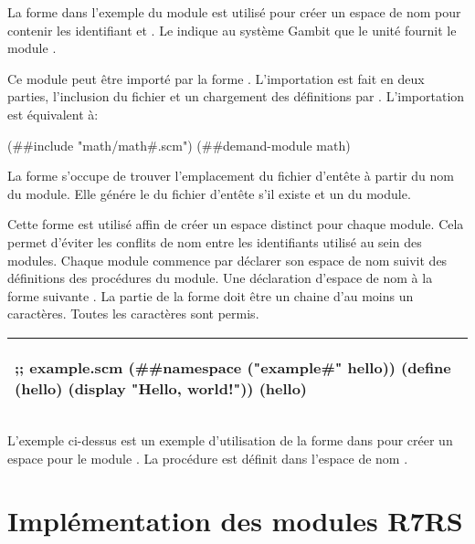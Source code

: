 La forme  dans l'exemple du module  est
utilisé pour créer un espace de nom pour contenir les identifiant 
et . Le  indique au système Gambit que
le unité  fournit le module .

Ce module peut être importé par la forme . L'importation
est fait en deux parties, l'inclusion du fichier  et
un chargement des définitions par . L'importation
 est équivalent à:

\begin{center}
  \begin{mplisting}{0.9}
  (##include "math/math#.scm")
  (##demand-module math)
  \end{mplisting}
\end{center}

La forme  s'occupe de trouver l'emplacement du fichier
d'entête à partir du nom du module. Elle génére le  du
fichier d'entête s'il existe et un  du module.

Cette forme est utilisé affin de créer un espace distinct pour chaque module.
Cela permet d'éviter les conflits de nom entre les identifiants utilisé au sein
des modules.  Chaque module commence par déclarer son espace de nom suivit des
définitions des procédures du module.  Une déclaration d'espace de nom à la
forme suivante . La partie 
de la forme  doit être un chaine d'au moins un caractères.
Toutes les caractères sont permis.

\begin{center}
  \begin{tabular}{|l|}
\hline
\begin{mplisting}{0.6}
;; example.scm
(##namespace ("example#" hello))
(define (hello)
  (display "Hello, world!\n"))
(hello)
\end{mplisting}\\\hline
  \end{tabular}
\end{center}
L'exemple ci-dessus est un exemple d'utilisation de la forme 
dans pour créer un espace pour le module . La procédure 
est définit dans l'espace de nom .

\section{Implémentation des modules R7RS}
